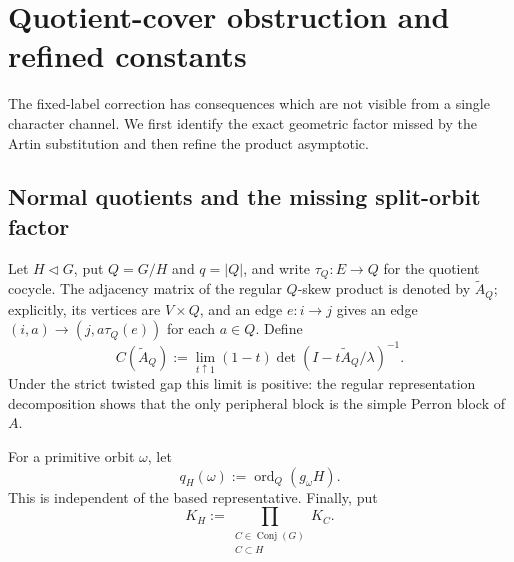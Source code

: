 \section{Quotient-cover obstruction and refined constants}
\label{sec:quotient-refinements}

The fixed-label correction has consequences which are not visible from a
single character channel.  We first identify the exact geometric factor
missed by the Artin substitution and then refine the product asymptotic.

\subsection{Normal quotients and the missing split-orbit factor}

Let \(H\triangleleft G\), put \(Q=G/H\) and \(q=|Q|\), and write
\(\tau_Q:E\to Q\) for the quotient cocycle.  The adjacency matrix of the
regular \(Q\)-skew product is denoted by \(\widetilde A_Q\); explicitly, its
vertices are \(V\times Q\), and an edge \(e:i\to j\) gives an edge
\((i,a)\to(j,a\tau_Q(e))\) for each \(a\in Q\).  Define
\begin{equation}\label{eq:quotient-cover-reduced-constant}
 C(\widetilde A_Q)
 :=\lim_{t\uparrow1}(1-t)
       \det(I-t\widetilde A_Q/\lambda)^{-1}.
\end{equation}
Under the strict twisted gap this limit is positive: the regular
representation decomposition shows that the only peripheral block is the
simple Perron block of \(A\).

For a primitive orbit \(\omega\), let
\begin{equation}\label{eq:quotient-holonomy-order}
 q_H(\omega):=\operatorname{ord}_Q(g_\omega H).
\end{equation}
This is independent of the based representative.  Finally, put
\begin{equation}\label{eq:normal-subgroup-product-constant}
 K_H:=\prod_{\substack{C\in\operatorname{Conj}(G)\\C\subset H}}K_C.
\end{equation}

